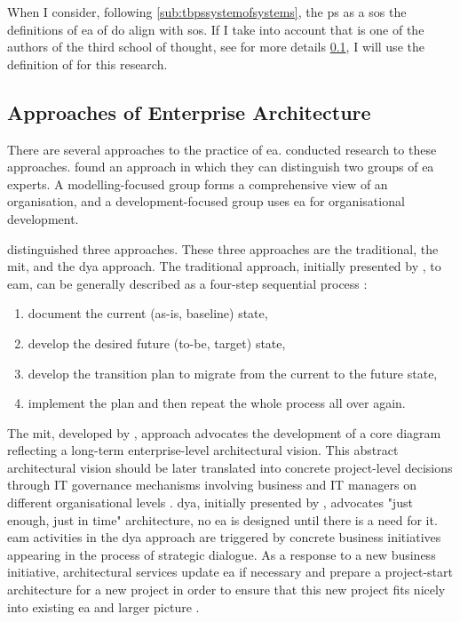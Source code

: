 When I consider, following \cref{sub:tbpssystemofsystems}, the \gls{ps} as a \acrfull{sos} the definitions of \acrshort{ea} of \textcites{Gartner}{Graves2009} do align with \acrshort{sos}. If I take into account that \textcite{Graves2009} is one of the authors of the third school of thought, see for more details \cref{sub:eaapproaches}, I will use the definition of \citeauthor{Graves2009} for this research.

\subsection{Approaches of Enterprise Architecture}
\label{sub:eaapproaches}
There are several approaches to the practice of \acrshort{ea}. \textcites{Lapalme2012}{Kotusev2015}{Ylinen2018}{Ylinen2020} conducted research to these approaches. \textcites{Ylinen2018}{Ylinen2020} found an approach in which they can distinguish two groups of \acrshort{ea} experts. A modelling-focused group forms a comprehensive view of an organisation, and a development-focused group uses \acrshort{ea} for organisational development. 

\textcite{Kotusev2015} distinguished three approaches. These three approaches are the traditional, the \acrfull{mit}, and the \acrfull{dya} approach. The traditional approach, initially presented by \textcite{Spewak1993}, to \acrfull{eam}, can be generally described as a four-step sequential process \parencite[p.~4071]{Kotusev2015}:
\begin{enumerate}
	\item{document the current (as-is, baseline) state,}
	\item{develop the desired future (to-be, target) state,}
	\item{develop the transition plan to migrate from the current to the future state,}
	\item{implement the plan and then repeat the whole process all over again.}
\end{enumerate}
The \acrshort{mit}, developed by \textcite{Ross2014}, approach advocates the development of a core diagram reflecting a long-term enterprise-level architectural vision. This abstract architectural vision should be later translated into concrete project-level decisions through IT governance mechanisms involving business and IT managers on different organisational levels \parencite[p.~4072]{Kotusev2015}. \acrfull{dya}, initially presented by \textcite{Wagter2005}, advocates "just enough, just in time" architecture, no \acrshort{ea} is designed until there is a need for it. \acrshort{eam} activities in the \acrshort{dya} approach are triggered by concrete business initiatives appearing in the process of strategic dialogue. As a response to a new business initiative, architectural services update \acrshort{ea} if necessary and prepare a project-start architecture for a new project in order to ensure that this new project fits nicely into existing \acrshort{ea} and larger picture \parencite[p.~4072]{Kotusev2015}. 

